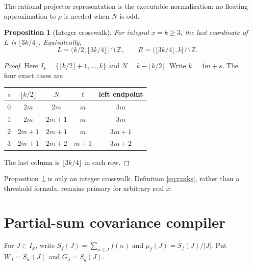 \documentclass[10pt]{article}
\newtheorem{proposition}[theorem]{Proposition}
\newcommand{\Z}{\mathbb Z}
\begin{document}
The rational projector representation is the executable normalization: no
floating approximation to $\rho$ is needed when $N$ is odd.

\begin{proposition}[Integer crosswalk]\label{prop:crosswalk}
For integral $x=k\geq3$, the last coordinate of $L$ is
$\lfloor3k/4\rfloor$.  Equivalently,
\[
 L=(k/2,\lfloor3k/4\rfloor]\cap\Z,\qquad
 R=(\lfloor3k/4\rfloor,k]\cap\Z.
\]
\end{proposition}

\begin{proof}
Here $I_k=\{\lfloor k/2\rfloor+1,\ldots,k\}$ and
$N=k-\lfloor k/2\rfloor$.  Write $k=4m+s$.  The four exact cases are
\begin{center}
\begin{tabular}{c@{\quad}c@{\quad}c@{\quad}c@{\quad}c}
\toprule
$s$ & $\lfloor k/2\rfloor$ & $N$ & $\ell$ & left endpoint \\
\midrule
$0$ & $2m$   & $2m$   & $m$   & $3m$ \\
$1$ & $2m$   & $2m+1$ & $m$   & $3m$ \\
$2$ & $2m+1$ & $2m+1$ & $m$   & $3m+1$ \\
$3$ & $2m+1$ & $2m+2$ & $m+1$ & $3m+2$ \\
\bottomrule
\end{tabular}
\end{center}
The last column is $\lfloor3k/4\rfloor$ in each row.
\end{proof}

Proposition~\ref{prop:crosswalk} is only an integer crosswalk.  Definition
\eqref{eq:ranks}, rather than a threshold formula, remains primary for
arbitrary real $x$.

\section{Partial-sum covariance compiler}

For $J\subset I_x$, write $S_f(J)=\sum_{n\in J}f(n)$ and
$\mu_f(J)=S_f(J)/|J|$.  Put $W_J=S_w(J)$ and $G_J=S_g(J)$.
\end{document}
